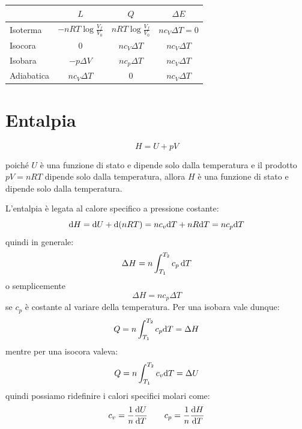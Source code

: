 \begin{center}
   \begin{tabular}{lccc}
                 & $L$                       & $Q$                      & $\Delta E$       \\
      \hline
      Isoterma   & $-nRT\log\frac{V_f}{V_0}$ & $nRT\log\frac{V_f}{V_0}$ & $nc_V\Delta T=0$ \\
      Isocora    & $0$                       & $nc_V\Delta T$           & $nc_V\Delta T$   \\
      Isobara    & $-p\Delta V$              & $nc_p\Delta T$           & $nc_V\Delta T$   \\
      Adiabatica & $nc_V\Delta T$            & $0$                      & $nc_V\Delta T$   \\
   \end{tabular}
\end{center}
\section{Entalpia}
\begin{Def}[Entalpia]
   \begin{equation}
      H = U + pV
   \end{equation}
\end{Def}
poiché $U$ è una funzione di stato e dipende solo dalla temperatura e il prodotto $pV=nRT$ dipende solo dalla temperatura, allora $H$ è una funzione di stato e dipende solo dalla temperatura.

L'entalpia è legata al calore specifico a pressione costante:
\begin{equation}
   \mathrm{d} H = \mathrm{d} U + \mathrm{d}(nRT) = nc_v\mathrm{d} T + nR\mathrm{d} T = nc_p\mathrm{d} T
\end{equation}
quindi in generale:
\begin{equation}
   \Delta H = n\int_{T_1}^{T_2} c_p\,\mathrm{d} T
\end{equation}
o semplicemente
\begin{equation}
   \Delta H = nc_p\Delta T
\end{equation}
se $c_p$ è costante al variare della temperatura. Per una isobara vale dunque:
\begin{equation*}
   Q = n\int_{T_1}^{T_2} c_p\mathrm{d} T = \Delta H
\end{equation*}
mentre per una isocora valeva:
\begin{equation*}
   Q = n\int_{T_1}^{T_2}c_v\mathrm{d} T = \Delta U
\end{equation*}
quindi possiamo ridefinire i calori specifici molari come:
\begin{equation}
   c_v = \frac{1}{n}\frac{\mathrm{d} U}{\mathrm{d} T} \qquad c_p = \frac{1}{n}\frac{\mathrm{d} H}{\mathrm{d} T}
\end{equation}


